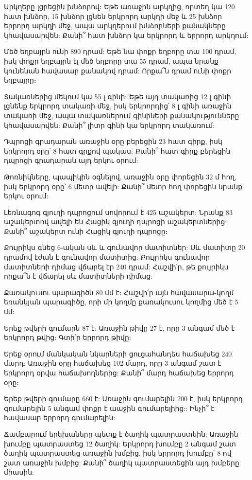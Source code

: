 \problem
Արկղերը լցրեցին խնձորով։ Եթե առաջին արկղից, որտեղ կա 120 
հատ խնձոր, 15 խնձոր լցնեն երկրորդ արկղի մեջ և 25 խնձոր 
երրորդ արկղի մեջ, ապա արկղերում խնձորների քանակները 
կհավասարվեն: Քանի՞ հատ խնձոր կա երկրորդ և երրորդ արկղում:

\problem
Մեծ եղբայրն ունի 890 դրամ: Եթե նա փոքր եղբորը տա 100 դրամ, 
իսկ փոքր եղբայրն էլ մեծ եղբորը տա 55 դրամ, ապա նրանք կունենան 
հավասար քանակով դրամ: Որքա՞ն դրամ ունի փոքր եղբայրը։

\problem
Տակառներից մեկում կա 55 լ գինի: Եթե այդ տակառից 12 լ 
գինի լցնենք երկրորդ տակառի մեջ, իսկ երկրորդից՝ 8 լ գինի 
առաջին տակառի մեջ, ապա տակառներում գինիների քանակությունները 
կհավասարվեն: Քանի՞ լիտր գինի կա երկրորդ տակառում:

\problem
Դպրոցի գրադարան առաջին օրը բերեցին 23 հատ գիրք, իսկ երկրորդ 
օրը՝ 8 հատ գրքով պակաս: Քանի՞ հատ գիրք բերեցին դպրոցի գրադարան 
այդ երկու օրում:

\problem
Թոռնիկները, պապիկին օգնելով, առաջին օրը փորեցին 32 մ հող, իսկ 
երկրորդ օրը՝ 6 մետր ավելի: Քանի՞ մետր հող փորեցին նրանք երկու օրում:

\problem
Լեռնագոգ գյուղի դպրոցում սովորում է 425 աշակերտ: Նրանք 83 
աշակերտով ավելի են Հացիկ գյուղի դպրոցի աշակերտներից: Քանի՞ 
աշակերտ ունի Հացիկ գյուղի դպրոցը։

\problem
Քույրիկս գնեց 6-ական սև և գունավոր մատիտներ: Սև մատիտը 20 
դրամով էժան է գունավոր մատիտից: Քույրիկս գունավոր մատիտների 
դիմաց վճարել էր 240 դրամ: Հաշվի՛ր, թե քույրիկս որքա՞ն է վճարել 
սև մատիտների դիմաց:

\problem
Քառակուսու պարագիծն 80 մմ է։ Հաշվի՛ր այն հավասարա-կողմ եռանկյան 
պարագիծը, որի մի կողմը քառակուսու կողմից մեծ է 5 մմ։

\problem
Երեք թվերի գումարն 87 է: Առաջին թիվը 27 է, որը 3 անգամ մեծ է 
երկրորդ թվից: Գտի՛ր երրորդ թիվը:

\problem
Երեք օրում մանկական նկարների ցուցահանդես հաճախեց 240 մարդ: Առաջին 
օրը հաճախեց 102 մարդ, որը 3 անգամ շատ է երկրորդ օրվա հաճախողներից: 
Քանի՞ մարդ հաճախեց երրորդ օրը։

\problem
Երեք թվերի գումարը 660 է: Առաջին գումարելին 200 է, իսկ երկրորդ 
գումարելին 5 անգամ փոքր է աաջին գումարելիից:: Ինչի՞ է հավասար 
երրորդ գումարելին:

\problem
Ճամբարում երեխաները պետք է ծաղիկ պատրաստեին: Առաջին խումբը 
պատրաստեց 12 ծաղիկ: Երկրորդ խումբը 2 անգամ շատ ծաղիկ պատրաստեց 
առաջին խմբից, իսկ երրորդ խումբը՝ 8-ով շատ առաջին խմբից: Քանի՞ 
ծաղիկ պատրաստեցին այդ խմբերը միասին:

